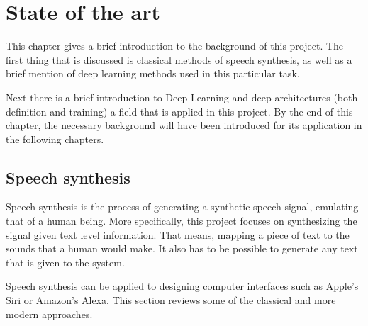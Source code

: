 \chapter{State of the art}

This chapter gives a brief introduction to the background of this project. The first thing that is discussed is classical methods of speech synthesis, as well as a brief mention of deep learning methods used in this particular task.

Next there is a brief introduction to Deep Learning and deep architectures (both definition and training) a field that is applied in this project. By the end of this chapter, the necessary background will have been introduced for its application in the following chapters.

\section{Speech synthesis}

Speech synthesis is the process of generating a synthetic speech signal, emulating that of a human being. More specifically, this project focuses on synthesizing the signal given text level information. That means, mapping a piece of text to the sounds that a human would make. It also has to be possible to generate any text that is given to the system.


Speech synthesis can be applied to designing computer interfaces such as Apple's Siri or Amazon's Alexa. This section reviews some of the classical and more modern approaches.


